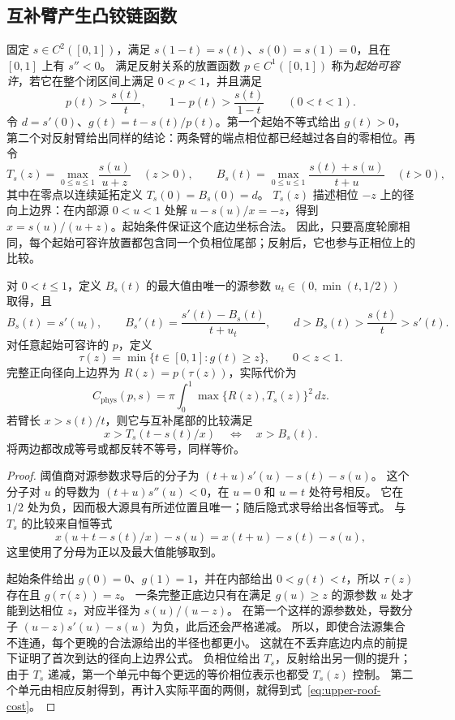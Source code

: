 \subsection{互补臂产生凸铰链函数}
\label{subsec:upper-hinge}

固定 $s\in C^2([0,1])$，满足 $s(1-t)=s(t)$、$s(0)=s(1)=0$，且在 $[0,1]$ 上有 $s''<0$。
满足反射关系的放置函数 $p\in C^1([0,1])$ 称为\emph{起始可容许}，若它在整个闭区间上满足 $0<p<1$，并且满足
\begin{equation}\label{eq:upper-birth}
 p(t)>\frac{s(t)}t,\qquad
 1-p(t)>\frac{s(t)}{1-t}\qquad(0<t<1).
\end{equation}
令 $d=s'(0)$、$g(t)=t-s(t)/p(t)$。第一个起始不等式给出 $g(t)>0$，第二个对反射臂给出同样的结论：两条臂的端点相位都已经越过各自的零相位。再令
\begin{equation}\label{eq:upper-tail-threshold}
 T_s(z)=\max_{0\le u\le1}\frac{s(u)}{u+z}\quad(z>0),
 \qquad B_s(t)=\max_{0\le u\le1}\frac{s(t)+s(u)}{t+u}\quad(t>0),
\end{equation}
其中在零点以连续延拓定义 $T_s(0)=B_s(0)=d$。
$T_s(z)$ 描述相位 $-z$ 上的径向上边界：在内部源 $0<u<1$ 处解 $u-s(u)/x=-z$，得到 $x=s(u)/(u+z)$。起始条件保证这个底边坐标合法。
因此，只要高度轮廓相同，每个起始可容许放置都包含同一个负相位尾部；反射后，它也参与正相位上的比较。

\begin{lemma}[阈值与完整径向上边界]\label{lem:upper-roof}
对 $0<t\le1$，定义 $B_s(t)$ 的最大值由唯一的源参数 $u_t\in(0,\min(t,1/2))$ 取得，且
\[
 B_s(t)=s'(u_t),\qquad
 B_s'(t)=\frac{s'(t)-B_s(t)}{t+u_t},\qquad
 d>B_s(t)>\frac{s(t)}t>s'(t).
\]
对任意起始可容许的 $p$，定义
\[
 \tau(z)=\min\{t\in[0,1]:g(t)\ge z\},\qquad 0<z<1.
\]
完整正向径向上边界为 $R(z)=p(\tau(z))$，实际代价为
\begin{equation}\label{eq:upper-roof-cost}
 C_{\mathrm{phys}}(p,s)=\pi\int_0^1\max\{R(z),T_s(z)\}^2\,dz.
\end{equation}
若臂长 $x>s(t)/t$，则它与互补尾部的比较满足
\[
 x>T_s(t-s(t)/x)\quad\Longleftrightarrow\quad x>B_s(t).
\]
将两边都改成等号或都反转不等号，同样等价。
\end{lemma}

\begin{proof}
阈值商对源参数求导后的分子为 $(t+u)s'(u)-s(t)-s(u)$。
这个分子对 $u$ 的导数为 $(t+u)s''(u)<0$，在 $u=0$ 和 $u=t$ 处符号相反。
它在 $1/2$ 处为负，因而极大源具有所述位置且唯一；随后隐式求导给出各恒等式。
与 $T_s$ 的比较来自恒等式
\[
 x(u+t-s(t)/x)-s(u)=x(t+u)-s(t)-s(u),
\]
这里使用了分母为正以及最大值能够取到。

起始条件给出 $g(0)=0$、$g(1)=1$，并在内部给出 $0<g(t)<t$，所以 $\tau(z)$ 存在且 $g(\tau(z))=z$。
一条完整正底边只有在满足 $g(u)\ge z$ 的源参数 $u$ 处才能到达相位 $z$，对应半径为 $s(u)/(u-z)$。
在第一个这样的源参数处，导数分子 $(u-z)s'(u)-s(u)$ 为负，此后还会严格递减。
所以，即使合法源集合不连通，每个更晚的合法源给出的半径也都更小。
这就在不丢弃底边内点的前提下证明了首次到达的径向上边界公式。
负相位给出 $T_s$，反射给出另一侧的提升；由于 $T_s$ 递减，第一个单元中每个更远的等价相位表示也都受 $T_s(z)$ 控制。
第二个单元由相应反射得到，再计入实际平面的两侧，就得到式~\eqref{eq:upper-roof-cost}。
\end{proof}

